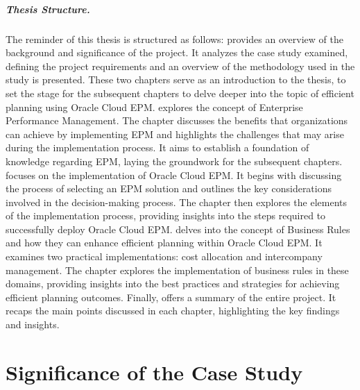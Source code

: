 \documentclass[12pt,a4paper,openright,twoside]{book}
\begin{document}
\newpage

\paragraph{Thesis Structure.}
%

The reminder of this thesis is structured as follows:
%
 provides an overview of the background and significance of the project.
%
It analyzes the case study examined, defining the project requirements and an overview of the methodology used in the study is presented. 
%
These two chapters serve as an introduction to the thesis, to set the stage for the subsequent chapters to delve deeper into the topic of efficient planning using Oracle Cloud EPM.
%
 explores the concept of Enterprise Performance Management. 
%
The chapter discusses the benefits that organizations can achieve by implementing EPM and highlights the challenges that may arise during the implementation process. 
%
It aims to establish a foundation of knowledge regarding EPM, laying the groundwork for the subsequent chapters.
%
 focuses on the implementation of Oracle Cloud EPM. 
%
It begins with discussing the process of selecting an EPM solution and outlines the key considerations involved in the decision-making process. 
%
The chapter then explores the elements of the implementation process, providing insights into the steps required to successfully deploy Oracle Cloud EPM. 
%
 delves into the concept of Business Rules and how they can enhance efficient planning within Oracle Cloud EPM. 
%
It examines two practical implementations: cost allocation and intercompany management. 
%
The chapter explores the implementation of business rules in these domains, providing insights into the best practices and strategies for achieving efficient planning outcomes. 
%
Finally,  offers a summary of the entire project. 
%
It recaps the main points discussed in each chapter, highlighting the key findings and insights. 

\chapter{Significance of the Case Study}
\label{chap:case study}
\end{document}
